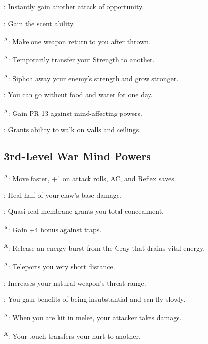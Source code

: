 : Instantly gain another attack of opportunity.

: Gain the scent ability.

\textsuperscript{A}: Make one weapon return to you after thrown. %

\textsuperscript{A}: Temporarily transfer your Strength to another. %

\textsuperscript{A}: Siphon away your enemy's strength and grow stronger.

: You can go without food and water for one day.

\textsuperscript{A}: Gain PR 13 against mind-affecting powers.

: Grants ability to walk on walls and ceilings.



\subsection{3rd-Level War Mind Powers}

\textsuperscript{A}: Move faster, +1 on attack rolls, AC, and Reflex saves. %

: Heal half of your claw's base damage.

: Quasi-real membrane grants you total concealment.

\textsuperscript{A}: Gain +4 bonus against traps.

\textsuperscript{A}: Release an energy burst from the Gray that drains vital energy. %

\textsuperscript{A}: Teleports you very short distance.

: Increases your natural weapon's threat range.

: You gain benefits of being insubstantial and can fly slowly.

\textsuperscript{A}: When you are hit in melee, your attacker takes damage.

\textsuperscript{A}: Your touch transfers your hurt to another.

